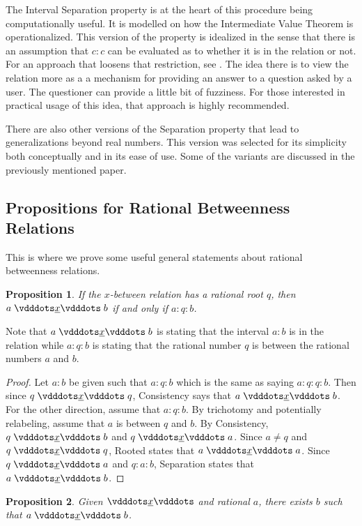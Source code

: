 \documentclass[12pt]{article}
\newtheorem{proposition}{Proposition}[section]
\begin{document}
The Interval Separation property is at the heart of this procedure being computationally useful. It is modelled on how the Intermediate Value Theorem is operationalized. This version of the property is idealized in the sense that there is an assumption that $c:c$ can be evaluated as to whether it is in the relation or not. For an approach that loosens that restriction, see \cite{taylor23main}. The idea there is to view the relation more as a a mechanism for providing an answer to a question asked by a user. The questioner can provide a little bit of fuzziness. For those interested in practical usage of this idea, that approach is highly recommended. 

There are also other versions of the Separation property that lead to generalizations beyond real numbers. This version was selected for its simplicity both conceptually and in its ease of use. Some of the variants are discussed in the previously mentioned paper. 

\subsection{Propositions for Rational Betweenness Relations}

This is where we prove some useful general statements about rational betweenness relations. 

\begin{proposition}\label{br:rooted}
    If the $x$-between relation has a rational root $q$, then $a \xrel b$ if and only if $a : q : b$.
\end{proposition}

Note that $a \xrel b$ is stating that the interval $a:b$ is in the relation while $a:q:b$ is stating that the rational number $q$ is between the rational numbers $a$ and $b$.

\begin{proof}
    Let $a : b$ be given such that $a : q : b$ which is the same as saying $a:q:q:b$. Then since $q \xrel q$, Consistency says that $a \xrel b$. For the other direction, assume that \sout{$a:q:b$}. By trichotomy and potentially relabeling, assume that $a$ is between $q$ and $b$. By Consistency, $q \xrel b$ and $q\xrel a$.  Since $a \neq q$ and $q \xrel q$, Rooted states that \sout{$a \xrel a$}. Since $q \xrel a$ and $q:a:b$, Separation states that \sout{$ a \xrel b$}. 
\end{proof}


\begin{proposition}\label{br:existence}
    Given $\xrel$ and rational $a$, there exists $b$ such that $a \xrel b$. 
\end{proposition}
\end{document}

